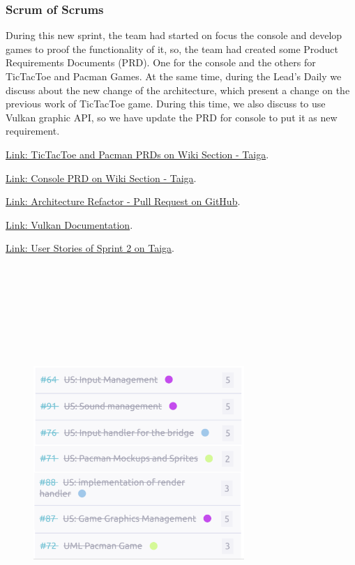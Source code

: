 \hypertarget{sos-s2} {
\subsubsection{Scrum of Scrums}\label{Scrum of Scrums} 
During this new sprint, the team had started on focus the console and develop 
games to proof the functionality of it, so, the team had created some Product 
Requirements Documents (PRD). One for the console and the others for TicTacToe 
and Pacman Games.
At the same time, during the Lead's Daily we discuss about the new change of 
the architecture, which present a change on the previous work of TicTacToe game. 
During this time, we also discuss to use Vulkan graphic API, so we have update 
the PRD for console to put it as new requirement.
}

\href{https://tree.taiga.io/project/joseluis-teran-coffeetime/wiki/fronted-team}{Link: TicTacToe and Pacman PRDs on Wiki Section - Taiga}.

\href{https://tree.taiga.io/project/joseluis-teran-coffeetime/wiki/backend-team}{Link: Console PRD on Wiki Section - Taiga}.

\href{https://github.com/Pending-Name-21/arquitecture/pull/5/files}{Link: Architecture Refactor - Pull Request on GitHub}.

\href{https://docs.vulkan.org/tutorial/latest/02_Development_environment.html#_linux}{Link: Vulkan Documentation}.

\href{https://tree.taiga.io/project/joseluis-teran-coffeetime/taskboard/sprint-2-12274}{Link: User Stories of Sprint 2 on Taiga}.

\begin{figure}
\centering
\includegraphics[width=8cm, height=15cm]{./artifacts/src/sprint-2/assets/us-s2.png}
\end{figure}

